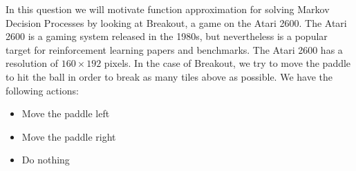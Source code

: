 \documentclass[11pt,addpoints,answers]{exam}
\begin{document}
\begin{questions}
\question
In this question we will motivate function approximation for solving Markov Decision Processes by looking at Breakout, a game on the Atari 2600. The Atari 2600 is a gaming system released in the 1980s, but nevertheless is a popular target for reinforcement learning papers and benchmarks. The Atari 2600 has a resolution of $160 \times 192$ pixels. In the case of Breakout, we try to move the paddle to hit the ball in order to break as many tiles above as possible. We have the following actions:
\begin{itemize}
    \item Move the paddle left
    \item Move the paddle right
    \item Do nothing
\end{itemize}


\end{questions}
\end{document}
